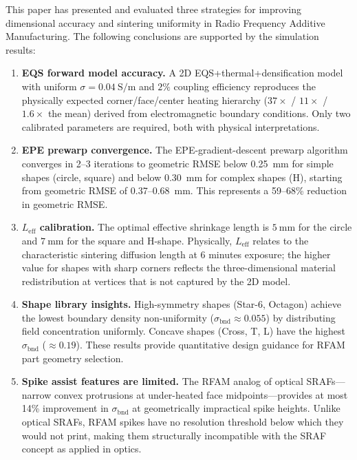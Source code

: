 \documentclass[5p,times]{elsarticle}
\newcommand{\bndstd}{\sigma_{\mathrm{bnd}}}
\newcommand{\Leff}{L_{\mathrm{eff}}}
\begin{document}
This paper has presented and evaluated three strategies for improving
dimensional accuracy and sintering uniformity in Radio Frequency
Additive Manufacturing.  The following conclusions are supported by
the simulation results:

\begin{enumerate}

\item \textbf{EQS forward model accuracy.}  A 2D EQS+thermal+densification
      model with uniform $\sigma = \SI{0.04}{\siemens\per\meter}$ and
      $2\%$ coupling efficiency reproduces the physically expected
      corner/face/center heating hierarchy ($37\times$ / $11\times$ /
      $1.6\times$ the mean) derived from electromagnetic boundary
      conditions.  Only two calibrated parameters are required, both
      with physical interpretations.

\item \textbf{EPE prewarp convergence.}  The EPE-gradient-descent
      prewarp algorithm converges in 2--3 iterations to geometric RMSE
      below \SI{0.25}{\milli\meter} for simple shapes (circle, square)
      and below \SI{0.30}{\milli\meter} for complex shapes (H), starting
      from geometric RMSE of 0.37--\SI{0.68}{\milli\meter}.  This
      represents a 59--68\% reduction in geometric RMSE.

\item \textbf{$\Leff$ calibration.}  The optimal effective shrinkage
      length is $\SI{5}{\milli\meter}$ for the circle and
      $\SI{7}{\milli\meter}$ for the square and H-shape.  Physically,
      $\Leff$ relates to the characteristic sintering diffusion length
      at 6 minutes exposure; the higher value for shapes with sharp
      corners reflects the three-dimensional material redistribution
      at vertices that is not captured by the 2D model.

\item \textbf{Shape library insights.}  High-symmetry shapes (Star-6,
      Octagon) achieve the lowest boundary density non-uniformity
      ($\bndstd \approx 0.055$) by distributing field concentration
      uniformly.  Concave shapes (Cross, T, L) have the highest
      $\bndstd$ ($\approx 0.19$).  These results provide quantitative
      design guidance for RFAM part geometry selection.

\item \textbf{Spike assist features are limited.}  The RFAM analog of
      optical SRAFs---narrow convex protrusions at under-heated face
      midpoints---provides at most 14\% improvement in $\bndstd$ at
      geometrically impractical spike heights.  Unlike optical SRAFs,
      RFAM spikes have no resolution threshold below which they would
      not print, making them structurally incompatible with the SRAF
      concept as applied in optics.


\end{enumerate}
\end{document}
